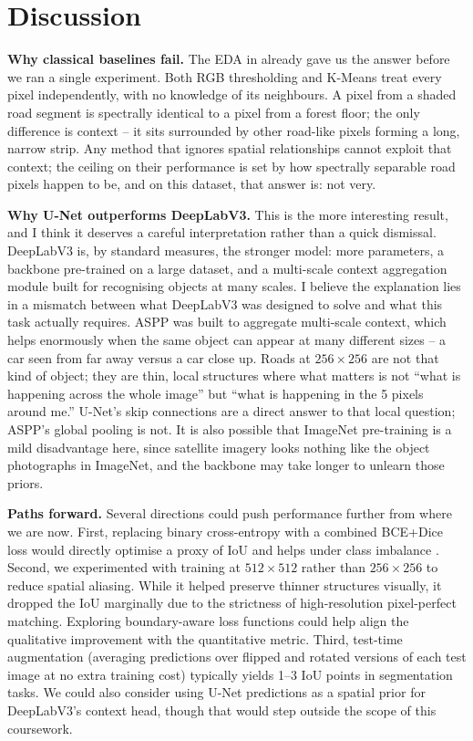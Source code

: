 \documentclass[conference]{IEEEtran}
\begin{document}
\section{Discussion}
\label{sec:discussion}

\textbf{Why classical baselines fail.}
The EDA in  already gave us the answer before we ran a single experiment.
Both RGB thresholding and K-Means treat every pixel independently, with no knowledge of its
neighbours.
A pixel from a shaded road segment is spectrally identical to a pixel from a forest floor;
the only difference is context -- it sits surrounded by other road-like pixels forming a
long, narrow strip.
Any method that ignores spatial relationships cannot exploit that context; the ceiling on
their performance is set by how spectrally separable road pixels happen to be, and on this
dataset, that answer is: not very.

\textbf{Why U-Net outperforms DeepLabV3.}
This is the more interesting result, and I think it deserves a careful interpretation rather
than a quick dismissal.
DeepLabV3 is, by standard measures, the stronger model: more parameters, a backbone
pre-trained on a large dataset, and a multi-scale context aggregation module built for
recognising objects at many scales.
I believe the explanation lies in a mismatch between what DeepLabV3 was designed to solve
and what this task actually requires.
ASPP was built to aggregate multi-scale context, which helps enormously when the same object
can appear at many different sizes -- a car seen from far away versus a car close up.
Roads at $256 \times 256$ are not that kind of object; they are thin, local structures where
what matters is not ``what is happening across the whole image'' but ``what is happening in
the 5 pixels around me.''
U-Net's skip connections are a direct answer to that local question; ASPP's global pooling
is not.
It is also possible that ImageNet pre-training is a mild disadvantage here, since satellite
imagery looks nothing like the object photographs in ImageNet, and the backbone may take
longer to unlearn those priors.

\textbf{Paths forward.}
Several directions could push performance further from where we are now.
First, replacing binary cross-entropy with a combined BCE+Dice loss would directly optimise
a proxy of IoU and helps under class imbalance \cite{milletari2016vnet}.
Second, we experimented with training at $512 \times 512$ rather than $256 \times 256$ to reduce spatial
aliasing. While it helped preserve thinner structures visually, it dropped the IoU marginally due to the strictness of high-resolution pixel-perfect matching. Exploring boundary-aware loss functions could help align the qualitative improvement with the quantitative metric.
Third, test-time augmentation (averaging predictions over flipped and rotated versions of
each test image at no extra training cost) typically yields 1--3 IoU points in segmentation
tasks.
We could also consider using U-Net predictions as a spatial prior for DeepLabV3's context
head, though that would step outside the scope of this coursework.
\end{document}
